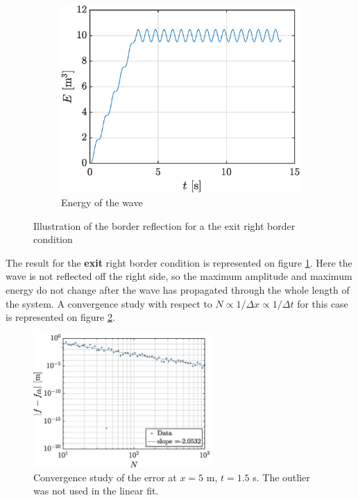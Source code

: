 \documentclass[a4paper,12pt,twoside]{article}
\begin{document}
\begin{figure}[h!]
    \centering
    \begin{subfigure}{0.5\textwidth}
    \includegraphics[width=\textwidth]{graphs/ex1Esortie.eps}
    \caption{Energy of the wave}
    \end{subfigure}

    \caption{Illustration of the border reflection for a the exit right border condition}
    \label{fig:ex1sor}
    \end{figure}

    The result for the \textbf{exit} right border condition is represented on figure \ref{fig:ex1sor}. Here the wave is not reflected off the right side, so the maximum amplitude and maximum energy do not change after the wave has propagated through the whole length of the system. A convergence study with respect to $N \propto 1/\Delta x \propto 1/\Delta t$ for this case is represented on figure \ref{fig:convN}.

    \begin{figure}[h!]
     \centering
     \includegraphics[width=0.6\textwidth]{graphs/convN.eps}
     \caption{Convergence study of the error at $x=5$ m, $t=1.5$ s. The outlier was not used in the linear fit.}
     \label{fig:convN}
    \end{figure}
\end{document}
